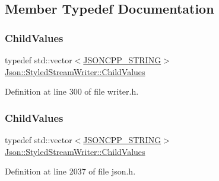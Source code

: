 \subsection{Member Typedef Documentation}
\hypertarget{class_json_1_1_styled_stream_writer_a259bf9d99847b2ea64ec9c6dd441944e}{}\label{class_json_1_1_styled_stream_writer_a259bf9d99847b2ea64ec9c6dd441944e} 
\subsubsection{\texorpdfstring{Child\+Values}{ChildValues}\hspace{0.1cm}{\footnotesize\ttfamily [1/2]}}
{\footnotesize\ttfamily typedef std\+::vector$<$\hyperlink{config_8h_a1e723f95759de062585bc4a8fd3fa4be}{J\+S\+O\+N\+C\+P\+P\+\_\+\+S\+T\+R\+I\+NG}$>$ \hyperlink{class_json_1_1_styled_stream_writer_a259bf9d99847b2ea64ec9c6dd441944e}{Json\+::\+Styled\+Stream\+Writer\+::\+Child\+Values}\hspace{0.3cm}{\ttfamily [private]}}



Definition at line 300 of file writer.\+h.

\hypertarget{class_json_1_1_styled_stream_writer_a259bf9d99847b2ea64ec9c6dd441944e}{}\label{class_json_1_1_styled_stream_writer_a259bf9d99847b2ea64ec9c6dd441944e} 
\subsubsection{\texorpdfstring{Child\+Values}{ChildValues}\hspace{0.1cm}{\footnotesize\ttfamily [2/2]}}
{\footnotesize\ttfamily typedef std\+::vector$<$\hyperlink{config_8h_a1e723f95759de062585bc4a8fd3fa4be}{J\+S\+O\+N\+C\+P\+P\+\_\+\+S\+T\+R\+I\+NG}$>$ \hyperlink{class_json_1_1_styled_stream_writer_a259bf9d99847b2ea64ec9c6dd441944e}{Json\+::\+Styled\+Stream\+Writer\+::\+Child\+Values}\hspace{0.3cm}{\ttfamily [private]}}



Definition at line 2037 of file json.\+h.



